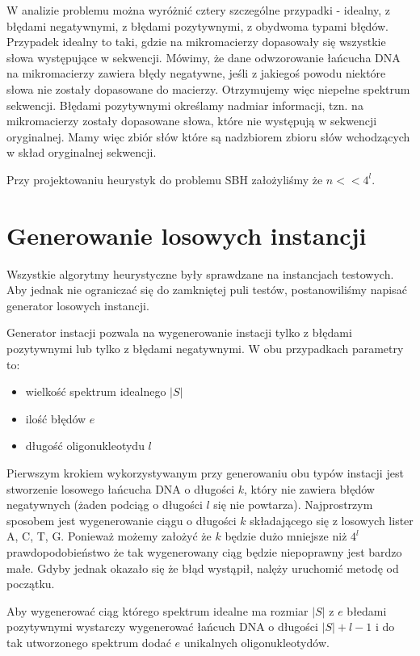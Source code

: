 \documentclass[a4paper,10pt]{article}
\begin{document}
W analizie problemu można wyróżnić cztery szczególne przypadki - idealny, z błędami negatywnymi, z błędami pozytywnymi, z obydwoma typami błędów.
Przypadek idealny to taki, gdzie na mikromacierzy dopasowały się wszystkie słowa występujące w sekwencji.
Mówimy, że dane odwzorowanie łańcucha DNA na mikromacierzy zawiera błędy negatywne, jeśli z jakiegoś powodu niektóre słowa nie
zostały dopasowane do macierzy. Otrzymujemy więc niepełne spektrum sekwencji.
Błędami pozytywnymi określamy nadmiar informacji, tzn. na mikromacierzy zostały dopasowane słowa, które nie występują w sekwencji
oryginalnej. Mamy więc zbiór słów które są nadzbiorem zbioru słów wchodzących w skład oryginalnej sekwencji.

Przy projektowaniu heurystyk do problemu SBH założyliśmy że $n << 4^l$.

\section{Generowanie losowych instancji}
Wszystkie algorytmy heurystyczne były sprawdzane na instancjach testowych. 
Aby jednak nie ograniczać się do zamkniętej puli testów, postanowiliśmy 
napisać generator losowych instancji. 

Generator instacji pozwala na wygenerowanie instacji tylko z błędami pozytywnymi
lub tylko z błędami negatywnymi. W obu przypadkach parametry to:
\begin{itemize}
 \item wielkość spektrum idealnego $|S|$
 \item ilość błędów $e$
 \item długość oligonukleotydu $l$
\end{itemize}

Pierwszym krokiem wykorzystywanym przy generowaniu obu typów instacji jest stworzenie
losowego łańcucha DNA o długości $k$, który nie zawiera błędów negatywnych (żaden 
podciąg o długości $l$ się nie powtarza). Najprostrzym sposobem jest wygenerowanie 
ciągu o długości $k$ składającego się z losowych lister A, C, T, G. Ponieważ możemy 
założyć że $k$ będzie dużo mniejsze niż $4^l$ prawdopodobieństwo że tak wygenerowany
ciąg będzie niepoprawny jest bardzo małe. Gdyby jednak okazało się że błąd wystąpił,
nalęży uruchomić metodę od początku.

Aby wygenerować ciąg którego spektrum idealne ma rozmiar $|S|$ z $e$ błedami pozytywnymi
wystarczy wygenerować łańcuch DNA o długości $|S|+l-1$ i do tak utworzonego spektrum 
dodać $e$ unikalnych oligonukleotydów.
\end{document}
